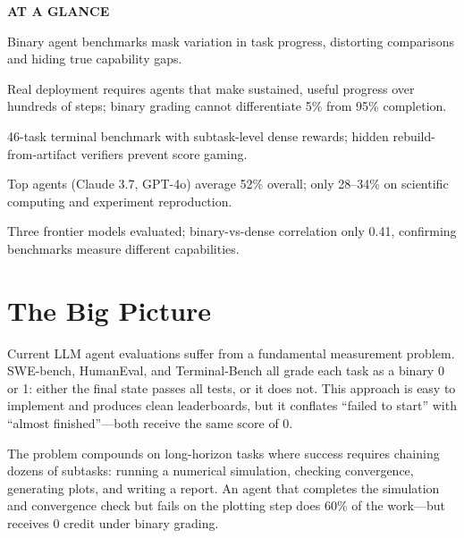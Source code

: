 \documentclass[10pt,twocolumn]{article}
\begin{document}
\begin{mdframed}[backgroundcolor=boxgray,linecolor=rulered,linewidth=1pt,
    innerleftmargin=6pt,innerrightmargin=6pt,
    innertopmargin=6pt,innerbottommargin=6pt]
\textbf{\small AT A GLANCE}\par\vspace{4pt}
\begin{description}[leftmargin=0pt,labelsep=4pt,itemsep=2pt,parsep=0pt,
    font=\small\bfseries]
  \item[Problem:] Binary agent benchmarks mask variation in task
    progress, distorting comparisons and hiding true capability gaps.
  \item[Why it matters:] Real deployment requires agents that make
    sustained, useful progress over hundreds of steps; binary grading
    cannot differentiate 5\% from 95\% completion.
  \item[Method:] 46-task terminal benchmark with subtask-level
    dense rewards; hidden rebuild-from-artifact verifiers prevent
    score gaming.
  \item[Result:] Top agents (Claude 3.7, GPT-4o) average 52\%
    overall; only 28--34\% on scientific computing and experiment
    reproduction.
  \item[Evidence:] Three frontier models evaluated; binary-vs-dense
    correlation only 0.41, confirming benchmarks measure different
    capabilities.
\end{description}
\end{mdframed}

\section{The Big Picture}

Current LLM agent evaluations suffer from a fundamental measurement
problem. SWE-bench, HumanEval, and Terminal-Bench all grade each
task as a binary 0 or 1: either the final state passes all tests, or
it does not. This approach is easy to implement and produces clean
leaderboards, but it conflates ``failed to start'' with ``almost
finished''---both receive the same score of 0.

The problem compounds on long-horizon tasks where success requires
chaining dozens of subtasks: running a numerical simulation, checking
convergence, generating plots, and writing a report. An agent that
completes the simulation and convergence check but fails on the
plotting step does 60\% of the work---but receives 0 credit under
binary grading.
\end{document}
